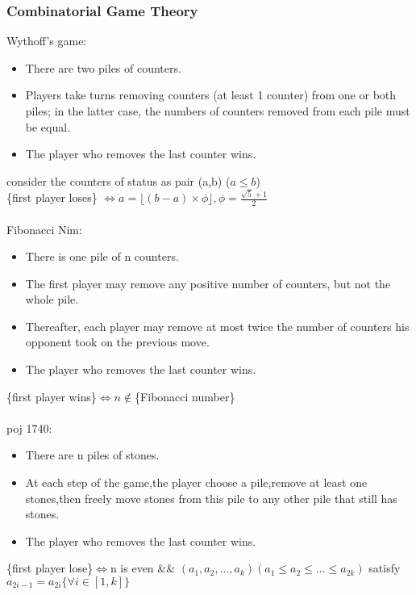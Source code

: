 \subsubsection{Combinatorial Game Theory}
Wythoff's game:
        \begin{itemize}
\item There are two piles of counters.
\item Players take turns removing counters (at least 1 counter) from one or both piles; in the latter case, the numbers of counters removed from each pile must be equal.\\
\item The player who removes the last counter wins. 
    \end{itemize}
consider the counters of status as pair (a,b) ($a\leq b$)\\
\{first player loses\} $\iff a=\lfloor (b-a)\times \phi \rfloor, \phi=\frac{\sqrt{5}+1}{2}$\\
    \\
Fibonacci Nim:
        \begin{itemize}
\item There is one pile of n counters.
\item The first player may remove any positive number of counters, but not the whole pile.
\item Thereafter, each player may remove at most twice the number of counters his opponent took on the previous move.
\item The player who removes the last counter wins.
    \end{itemize}
\{first player wins\}$\iff n \not\in$\{Fibonacci number\}\\
        \\
poj 1740:
    \begin{itemize}
\item There are n piles of stones.
\item At each step of the game,the player choose a pile,remove at least one stones,then freely move stones from this pile to any other pile that still has stones. 
\item The player who removes the last counter wins.
    \end{itemize}
    \{first player lose\}$\iff$n is even \&\& $(a_1,a_2,...,a_k)(a_1\leq a_2\leq ...\leq a_{2k})$ satisfy $a_{2i-1}=a_{2i}\{\forall i \in [1,k]\}$\\
\\

